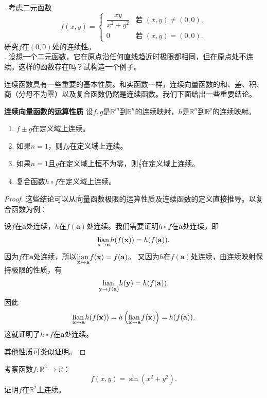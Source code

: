 \documentclass[12pt,UTF8]{ctexbook}
\begin{document}
\begin{sk}
\mbox{}\\
. 考虑二元函数
$$ f(x, y) = \begin{cases}
\dfrac{xy}{x^2+y^2} & \text{若 } (x, y) \neq (0, 0), \\
0 & \text{若 } (x, y) = (0, 0).
\end{cases} $$
研究$f$在$(0, 0)$处的连续性。\\
. 设想一个二元函数，它在原点沿任何直线趋近时极限都相同，但在原点处不连续。这样的函数存在吗？试构造一个例子。
\end{sk}

连续函数具有一些重要的基本性质。和实函数一样，连续向量函数的和、差、积、商（分母不为零）以及复合函数仍然是连续函数。我们下面给出一些重要结论。

\begin{tm}{\textbf{连续向量函数的运算性质}}
设$f, g$是$\mathbb{R}^m$到$\mathbb{R}^n$的连续映射，$h$是$\mathbb{R}^n$到$\mathbb{R}^p$的连续映射。
\begin{enumerate}
\item $f \pm g$在定义域上连续。
\item 如果$n=1$，则$fg$在定义域上连续。
\item 如果$n=1$且$g$在定义域上恒不为零，则$\frac{f}{g}$在定义域上连续。
\item 复合函数$h \circ f$在定义域上连续。
\end{enumerate}
\end{tm}

\begin{proof}
这些结论可以从向量函数极限的运算性质及连续函数的定义直接推导。以复合函数为例：

设$f$在$\mathbf{a}$处连续，$h$在$f(\mathbf{a})$处连续。我们需要证明$h \circ f$在$\mathbf{a}$处连续，即
$$ \underset{\mathbf{x}\to \mathbf{a}}{\operatorname{lian}\,} h(f(\mathbf{x})) = h(f(\mathbf{a})). $$
因为$f$在$\mathbf{a}$处连续，所以$\underset{\mathbf{x}\to \mathbf{a}}{\operatorname{lian}\,} f(\mathbf{x}) = f(\mathbf{a})$。
又因为$h$在$f(\mathbf{a})$处连续，由连续映射保持极限的性质，有
$$ \underset{\mathbf{y}\to f(\mathbf{a})}{\operatorname{lian}\,} h(\mathbf{y}) = h(f(\mathbf{a})). $$
因此
$$ \underset{\mathbf{x}\to \mathbf{a}}{\operatorname{lian}\,} h(f(\mathbf{x})) = h\left(\underset{\mathbf{x}\to \mathbf{a}}{\operatorname{lian}\,} f(\mathbf{x})\right) = h(f(\mathbf{a})), $$
这就证明了$h \circ f$在$\mathbf{a}$处连续。

其他性质可类似证明。
\end{proof}

\begin{et}
考察函数$f: \mathbb{R}^2 \to \mathbb{R}$：
$$ f(x, y) = \sin(x^2 + y^2). $$
证明$f$在$\mathbb{R}^2$上连续。
\end{et}
\end{document}
